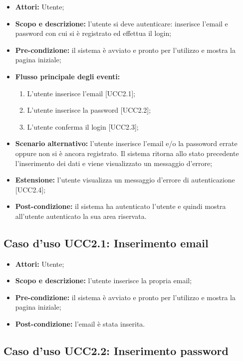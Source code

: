 \begin{itemize}
\item \textbf{Attori:} Utente;
\item \textbf{Scopo e descrizione:} l'utente si deve autenticare: inserisce l'email e password con cui si è registrato ed effettua il login;
\item \textbf{Pre-condizione:} il sistema è avviato e pronto per l'utilizzo e mostra la pagina iniziale;
\item \textbf{Flusso principale degli eventi:}
\begin{enumerate}
\item L'utente inserisce l'email [UCC2.1];
\item L'utente inserisce la password [UCC2.2];
\item L'utente conferma il login [UCC2.3];
\end{enumerate}
\item \textbf{Scenario alternativo:} l'utente inserisce l'email e/o la passoword errate oppure non si è ancora registrato. Il sistema ritorna allo stato precedente l'inserimento dei dati e viene visualizzato un messaggio d'errore;
\item \textbf{Estensione:} l'utente visualizza un messaggio d'errore di autenticazione [UCC2.4];
\item \textbf{Post-condizione:} il sistema ha autenticato l'utente e quindi mostra all'utente autenticato la sua area riservata.
\end{itemize}

\subsection{Caso d'uso UCC2.1: Inserimento email}

\begin{itemize}
\item \textbf{Attori:} Utente;
\item \textbf{Scopo e descrizione:} l'utente inserisce la propria email;
\item \textbf{Pre-condizione:} il sistema è avviato e pronto per l'utilizzo e mostra la pagina iniziale;
\item \textbf{Post-condizione:} l'email è stata inserita.
\end{itemize}

\subsection{Caso d'uso UCC2.2: Inserimento password}

